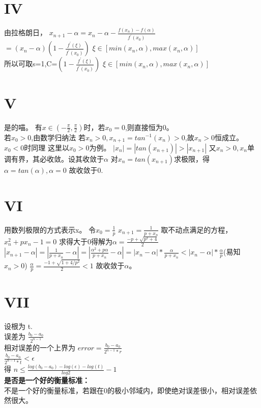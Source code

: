 \documentclass{article}
\begin{document}
\section*{IV}
\begin{flushleft}
  由拉格朗日，
  $x_{n+1}-\alpha=x_n-\alpha-\frac{f(x_n)-f(\alpha)}{f^{'}(x_0)}$\\
  $=(x_n-\alpha)(1-\frac{f^{'}(\xi)}{f^{'}(x_0)})$  $\xi \in [min(x_n,\alpha),max(x_n,\alpha)]$\\
  所以可取s=1,C=$(1-\frac{f^{'}(\xi)}{f^{'}(x_0)})$  $\xi \in [min(x_n,\alpha),max(x_n,\alpha)]$\\
  


\end{flushleft}

\section*{V}
\begin{flushleft}
  是的喵。
  有$x \in (-\frac{\pi}{2},\frac{\pi}{2})$时，若$x_0=0$,则直接恒为0。\\
  若$x_0>0$,由数学归纳法 $若x_n>0,x_{n+1}=tan^{-1}(x_n)>0$,故$x_n>0$恒成立。$x_0<0$时同理
  这里以$x_0>0$为例。
  $|x_n|=|tan(x_{n+1})|>|x_{n+1}|$
  又$x_n>0,{x_n}$单调有界，其必收敛。设其收敛于$\alpha$
  对$x_n=tan(x_{n+1})$求极限，得$\alpha=tan(\alpha),\alpha=0$
  故收敛于0.
\end{flushleft}

\section*{VI}
\begin{flushleft}
  用数列极限的方式表示x。
  令$x_0=\frac{1}{p}$
  $x_{n+1}=\frac{1}{p+x_n}$
  取不动点满足的方程，$x_n^2+px_n-1=0$
  求得大于0得解为$\alpha=\frac{-p+\sqrt{p^2+4}}{2}$
  $|x_{n+1}-\alpha|=|\frac{1}{p+x_n}-\alpha|=|\frac{\alpha^2+p\alpha}{p+x_n}-\alpha|=|x_n-\alpha|*\frac{\alpha}{p+x_n}<|x_n-\alpha|*\frac{\alpha}{p}$(易知$x_n>0$)
  $\frac{\alpha}{p}=\frac{-1+\sqrt{1+4/p^2}}{2}<1$
  故收敛于$\alpha$。

\end{flushleft}

\section*{VII}
\begin{flushleft}
  设根为 t.\\
  误差为  $\frac{b_0-a_0}{2^{n-1}}$\\
  相对误差的一个上界为  $error=\frac{b_0-a_0}{2^{n-1}*r}$\\
  $\frac{b_0-a_0}{2^{n-1}*t}<\epsilon$\\
  得    $n \leq \frac{log(b_0-a_0)-log(\epsilon)-log(t)}{log 2}-1$\\
  \textbf{是否是一个好的衡量标准：}\\
  不是一个好的衡量标准，若跟在0的极小邻域内，即使绝对误差很小，相对误差依然很大。
\end{flushleft}
\end{document}
